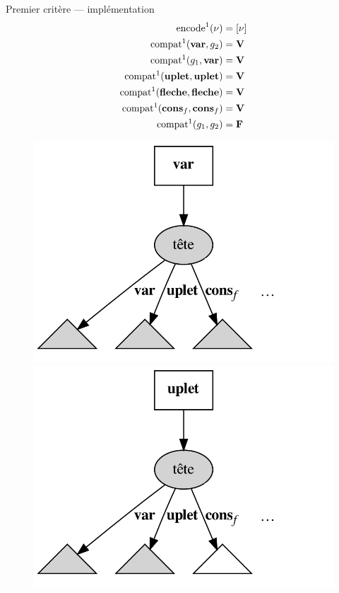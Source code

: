 \documentclass[serif]{beamer}
\begin{document}
\begin{frame}{Premier critère — implémentation}
\footnotesize
\begin{align*}
		\mathrm{encode}^1 (\nu) &=
		[ \nu ]
	\\
		\mathrm{compat}^1 (\bold{var}, {g}_2) &=
		\bold{V}
	\\
		\mathrm{compat}^1 ({g}_1, \bold{var}) &=
		\bold{V}
	\\
		\mathrm{compat}^1 (\bold{uplet}, \bold{uplet}) &=
		\bold{V}
	\\
		\mathrm{compat}^1 (\bold{fleche}, \bold{fleche}) &=
		\bold{V}
	\\
		\mathrm{compat}^1 (\bold{cons}_f, \bold{cons}_f) &=
		\bold{V}
	\\
		\mathrm{compat}^1 ({g}_1, {g}_2) &=
		\bold{F}
\end{align*}
\begin{figure}[h]
	\centering
	\includegraphics[scale=0.12]{graphs/crit1_1}
	\includegraphics[scale=0.12]{graphs/crit1_2}

\end{figure}
\end{frame}
\end{document}
